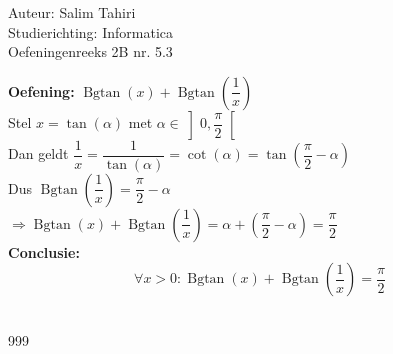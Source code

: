 \documentclass[a4paper]{article}
\begin{document}
  
\noindent \large Auteur: Salim Tahiri\\
\noindent \large Studierichting: Informatica\\
\noindent \large Oefeningenreeks 2B nr. 5.3\\

\normalsize

\textbf{Oefening:} $ \operatorname{Bgtan}(x) + \operatorname{Bgtan}\left(\dfrac{1}{x}\right) $\\

Stel $ x = \tan(\alpha) $ met $ \alpha \in \left]0, \dfrac{\pi}{2}\right[ $\\

Dan geldt $ \dfrac{1}{x} = \dfrac{1}{\tan(\alpha)} = \cot(\alpha) = \tan\left(\dfrac{\pi}{2} - \alpha\right) $\\

Dus $\operatorname{Bgtan}\left(\dfrac{1}{x}\right) = \dfrac{\pi}{2} - \alpha$\\

$ \Rightarrow \operatorname{Bgtan}(x) + \operatorname{Bgtan}\left(\dfrac{1}{x}\right) = \alpha + \left(\dfrac{\pi}{2} - \alpha\right) = \dfrac{\pi}{2} $ \\

\textbf{Conclusie:} \\
$$ \forall x > 0 : \operatorname{Bgtan}(x) + \operatorname{Bgtan}\left(\dfrac{1}{x}\right) = \dfrac{\pi}{2} $$\\

\begin{thebibliography}{999}
\end{thebibliography}
\end{document}
